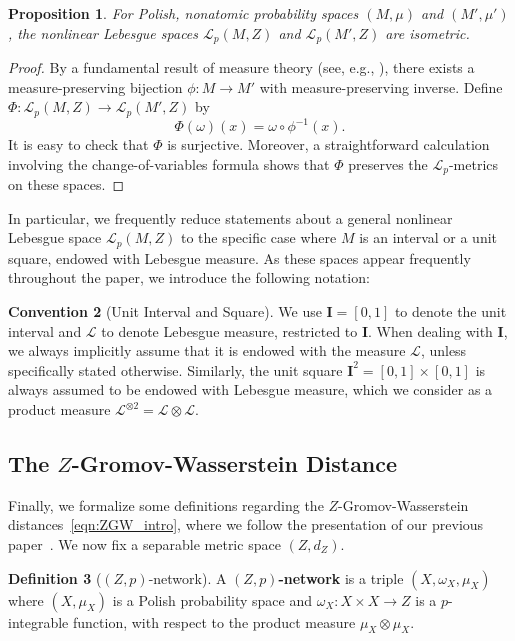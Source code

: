\documentclass{article}
\newtheorem{proposition}{Proposition}[section]
\theoremstyle{definition}
\newtheorem{definition}[proposition]{Definition}
\newtheorem{convention}[proposition]{Convention}
\newcommand{\Lp}{\mathcal{L}_p}
\begin{document}
\begin{proposition}\label{prop:nonlinear_Lebesgue_isometry}
    For Polish, nonatomic probability spaces $(M,\mu)$ and $(M',\mu')$, the nonlinear Lebesgue spaces $\Lp(M,Z)$ and $\Lp(M',Z)$ are isometric.
\end{proposition}

\begin{proof}
    By a fundamental result of measure theory (see, e.g., \cite[Theorem 17.41]{kechris2012classical}), there exists a measure-preserving bijection $\phi:M \to M'$ with measure-preserving inverse. Define $\Phi:\Lp(M,Z) \to \Lp(M',Z)$ by 
    \[
    \Phi(\omega)(x) = \omega \circ \phi^{-1}(x).
    \]
    It is easy to check that $\Phi$ is surjective. Moreover, a straightforward calculation involving the change-of-variables formula shows that $\Phi$ preserves the $\Lp$-metrics on these spaces.
\end{proof}

In particular, we frequently reduce statements about a general nonlinear Lebesgue space $\Lp(M,Z)$ to the specific case where $M$ is an interval or a unit square, endowed with Lebesgue measure. As these spaces appear frequently throughout the paper, we introduce the following notation:

\begin{convention}[Unit Interval and Square]\label{conv:unit_square}
    We use $\mathbf{I} = [0,1]$ to denote the unit interval and $\mathscr{L}$ to denote Lebesgue measure, restricted to $\mathbf{I}$. When dealing with $\mathbf{I}$, we always implicitly assume that it is endowed with the measure $\mathscr{L}$, unless specifically stated otherwise. Similarly, the unit square $\mathbf{I}^2 = [0,1] \times [0,1]$ is always assumed to be endowed with Lebesgue measure, which we consider as a product measure $\mathscr{L}^{\otimes 2} = \mathscr{L} \otimes \mathscr{L}$. 
\end{convention}


\subsection{The \texorpdfstring{$Z$}{Z}-Gromov-Wasserstein Distance}\label{sec:GWZ_distance}
Finally, we formalize some definitions regarding the $Z$-Gromov-Wasserstein distances~\eqref{eqn:ZGW_intro}, where we follow the presentation of our previous paper~\cite{bauer2025zgromovwassersteindistance}. We now fix a separable metric space $(Z,d_Z)$. 

\begin{definition}[$(Z,p)$-network]\label{def:znetwork}
A \textbf{$(Z,p)$-network} is a triple $(X,\omega_X,\mu_X)$ where $(X,\mu_X)$ is a Polish probability space
and $\omega_X:X \times X \to Z$ is a $p$-integrable function, with respect to the product measure $\mu_X \otimes \mu_X$.
\end{definition}
\end{document}
